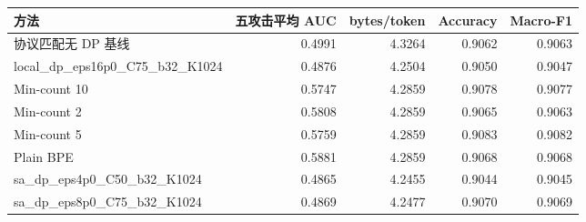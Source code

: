 \begin{tabular}{lrrrr}
\toprule
方法 & 五攻击平均 AUC & bytes/token & Accuracy & Macro-F1 \\
\midrule
协议匹配无 DP 基线 & 0.4991 & 4.3264 & 0.9062 & 0.9063 \\
local\_dp\_eps16p0\_C75\_b32\_K1024 & 0.4876 & 4.2504 & 0.9050 & 0.9047 \\
Min-count 10 & 0.5747 & 4.2859 & 0.9078 & 0.9077 \\
Min-count 2 & 0.5808 & 4.2859 & 0.9065 & 0.9063 \\
Min-count 5 & 0.5759 & 4.2859 & 0.9083 & 0.9082 \\
Plain BPE & 0.5881 & 4.2859 & 0.9068 & 0.9068 \\
sa\_dp\_eps4p0\_C50\_b32\_K1024 & 0.4865 & 4.2455 & 0.9044 & 0.9045 \\
sa\_dp\_eps8p0\_C75\_b32\_K1024 & 0.4869 & 4.2477 & 0.9070 & 0.9069 \\
\bottomrule
\end{tabular}
